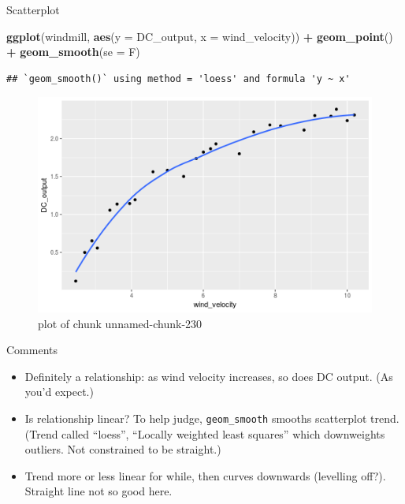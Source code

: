 \documentclass[ignorenonframetext,]{beamer}
\newenvironment{Shaded}{\begin{snugshade}}{\end{snugshade}}
\newcommand{\DataTypeTok}[1]{\textcolor[rgb]{0.13,0.29,0.53}{#1}}
\newcommand{\KeywordTok}[1]{\textcolor[rgb]{0.13,0.29,0.53}{\textbf{#1}}}
\newcommand{\NormalTok}[1]{#1}
\newcommand{\OperatorTok}[1]{\textcolor[rgb]{0.81,0.36,0.00}{\textbf{#1}}}
\newcommand{\StringTok}[1]{\textcolor[rgb]{0.31,0.60,0.02}{#1}}
\providecommand{\tightlist}{%
  \setlength{\itemsep}{0pt}\setlength{\parskip}{0pt}}
\begin{document}
\begin{frame}[fragile]{Scatterplot}
\protect\hypertarget{scatterplot}{}

\begin{Shaded}
\begin{Highlighting}[]
\KeywordTok{ggplot}\NormalTok{(windmill, }\KeywordTok{aes}\NormalTok{(}\DataTypeTok{y =}\NormalTok{ DC_output, }\DataTypeTok{x =}\NormalTok{ wind_velocity)) }\OperatorTok{+}
\StringTok{  }\KeywordTok{geom_point}\NormalTok{() }\OperatorTok{+}\StringTok{ }\KeywordTok{geom_smooth}\NormalTok{(}\DataTypeTok{se =}\NormalTok{ F)}
\end{Highlighting}
\end{Shaded}

\begin{verbatim}
## `geom_smooth()` using method = 'loess' and formula 'y ~ x'
\end{verbatim}

\begin{figure}
\centering
\includegraphics{figure/unnamed-chunk-230-1.png}
\caption{plot of chunk unnamed-chunk-230}
\end{figure}

\end{frame}

\begin{frame}[fragile]{Comments}
\protect\hypertarget{comments-10}{}

\begin{itemize}
\tightlist
\item
  Definitely a relationship: as wind velocity increases, so does DC
  output. (As you'd expect.)
\item
  Is relationship linear? To help judge, \texttt{geom\_smooth} smooths
  scatterplot trend. (Trend called ``loess'', ``Locally weighted least
  squares'' which downweights outliers. Not constrained to be straight.)
\item
  Trend more or less linear for while, then curves downwards (levelling
  off?). Straight line not so good here.
\end{itemize}

\end{frame}
\end{document}
